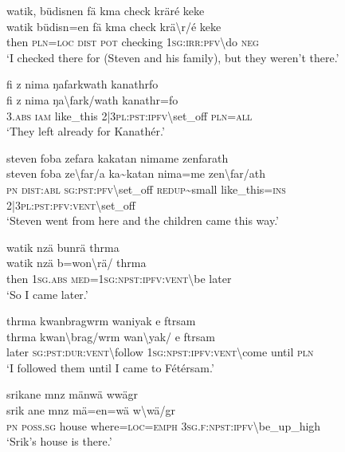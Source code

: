 \ea\label{ex:13:a1423}
watik, büdisnen fä kma check kräré keke\\
\gll watik	büdisn=en	fä	kma	check	krä{\textbackslash}r/é	keke\\
     then	\textsc{pln}=\textsc{loc}	\textsc{dist}	\textsc{pot}	checking	1\textsc{sg}:\textsc{irr}:\textsc{pfv}{\textbackslash}do	\textsc{neg}\\
\glt `I checked there for (Steven and his family), but they weren't there.'
\z

\ea\label{ex:13:a1424}
fi z nima ŋafarkwath kanathrfo\\
\gll fi	z	nima	ŋa{\textbackslash}fark/wath	kanathr=fo\\
     3.\textsc{abs}	\textsc{iam}	like\_this	2|3\textsc{pl}:\textsc{pst}:\textsc{ipfv}{\textbackslash}set\_off	\textsc{pln}=\textsc{all}\\
\glt `They left already for Kanathér.'
\z

\ea\label{ex:13:a1425}
steven foba zefara kakatan nimame zenfarath\\
\gll steven	foba	ze{\textbackslash}far/a	ka{\textasciitilde}katan	nima=me	zen{\textbackslash}far/ath\\
     \textsc{pn}	\textsc{dist}:\textsc{abl}	\textsc{sg}:\textsc{pst}:\textsc{pfv}{\textbackslash}set\_off	\textsc{redup}{\textasciitilde}small	like\_this=\textsc{ins}	2|3\textsc{pl}:\textsc{pst}:\textsc{pfv}:\textsc{vent}{\textbackslash}set\_off\\
\glt `Steven went from here and the children came this way.'
\z

\ea\label{ex:13:a1426}
watik nzä bunrä thrma\\
\gll watik	nzä	b=won{\textbackslash}rä/	thrma\\
     then	1\textsc{sg}.\textsc{abs}	\textsc{med}=1\textsc{sg}:\textsc{npst}:\textsc{ipfv}:\textsc{vent}{\textbackslash}be	later\\
\glt `So I came later.'
\z

\ea\label{ex:13:a1428}
thrma kwanbragwrm waniyak e ftrsam\\
\gll thrma	kwan{\textbackslash}brag/wrm	wan{\textbackslash}yak/	e	ftrsam\\
     later	\textsc{sg}:\textsc{pst}:\textsc{dur}:\textsc{vent}{\textbackslash}follow	1\textsc{sg}:\textsc{npst}:\textsc{ipfv}:\textsc{vent}{\textbackslash}come	until	\textsc{pln}\\
\glt `I followed them until I came to Fétérsam.'
\z

\ea\label{ex:13:a1431}
srikane mnz mänwä wwägr\\
\gll srik	ane	mnz	mä=en=wä	w{\textbackslash}wä/gr\\
     \textsc{pn}	\textsc{poss}.\textsc{sg}	house	where=\textsc{loc}=\textsc{emph}	3\textsc{sg}.\textsc{f}:\textsc{npst}:\textsc{ipfv}{\textbackslash}be\_up\_high\\
\glt `Srik's house is there.'
\z

